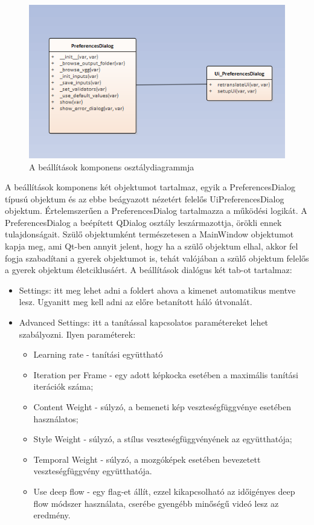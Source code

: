 \documentclass[12pt, a4paper, oneside]{book}
\theoremstyle{tetel}
\begin{document}
\begin{figure}[!htbp]
	\begin{center}
		\includegraphics[scale=0.7]{preferences.png}
		\caption{A beállítások komponens osztálydiagrammja}
		\label{preferences_class}
	\end{center}
\end{figure}

A beállítások komponens két objektumot tartalmaz, egyik a PreferencesDialog típusú objektum és az ebbe beágyazott nézetért felelős UiPreferencesDialog objektum. Értelemszerűen a PreferencesDialog tartalmazza a működési logikát.
\newline
\indent
A PreferencesDialog a beépített QDialog osztály leszármazottja, örökli ennek tulajdonságait. Szülő objektumként természetesen a MainWindow objektumot kapja meg, ami Qt-ben annyit jelent, hogy ha a szülő objektum elhal, akkor fel fogja szabadítani a gyerek objektumot is, tehát valójában a szülő objektum felelős a gyerek objektum életciklusáért.
A beállítások dialógus két tab-ot tartalmaz:

\begin{itemize}
	\item Settings: itt meg lehet adni a foldert ahova a kimenet automatikus mentve lesz. Ugyanitt meg kell adni az előre betanított háló útvonalát.
	\item Advanced Settings: itt a tanítással kapcsolatos paramétereket lehet szabályozni. Ilyen paraméterek:
	\begin{itemize}
		\item Learning rate - tanítási együttható 
		\item Iteration per Frame - egy adott képkocka esetében a maximális tanítási iterációk száma;
		\item Content Weight - súlyzó, a bemeneti kép veszteségfüggvénye esetében használatos;
		\item Style Weight - súlyzó, a stílus veszteségfüggvényének az együtthatója;
		\item Temporal Weight - súlyzó, a mozgóképek esetében bevezetett veszteségfüggvény együtthatója.
		\item Use deep flow - egy flag-et állít, ezzel kikapcsolható az időigényes deep flow módszer használata, cserébe gyengébb minőségű videó lesz az eredmény. 
	\end{itemize}
\end{itemize}
\end{document}
